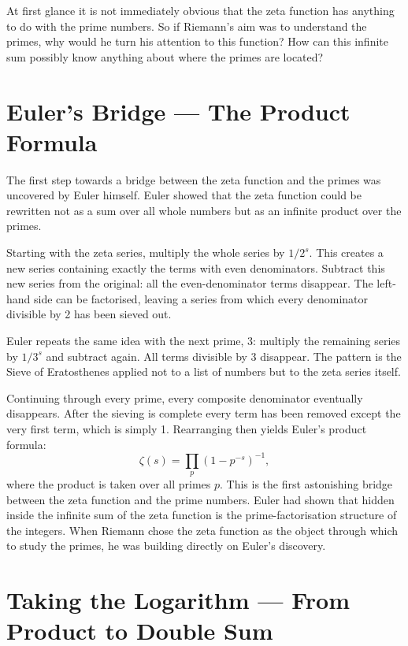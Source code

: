\documentclass[11pt]{article}
\begin{document}
At first glance it is not immediately obvious that the zeta function has anything to do with the prime numbers. So if Riemann's aim was to understand the primes, why would he turn his attention to this function? How can this infinite sum possibly know anything about where the primes are located?

\section{Euler's Bridge --- The Product Formula}

The first step towards a bridge between the zeta function and the primes was uncovered by Euler himself. Euler showed that the zeta function could be rewritten not as a sum over all whole numbers but as an infinite product over the primes.

Starting with the zeta series, multiply the whole series by $1/2^s$. This creates a new series containing exactly the terms with even denominators. Subtract this new series from the original: all the even-denominator terms disappear. The left-hand side can be factorised, leaving a series from which every denominator divisible by 2 has been sieved out.

Euler repeats the same idea with the next prime, 3: multiply the remaining series by $1/3^s$ and subtract again. All terms divisible by 3 disappear. The pattern is the Sieve of Eratosthenes applied not to a list of numbers but to the zeta series itself.

Continuing through every prime, every composite denominator eventually disappears. After the sieving is complete every term has been removed except the very first term, which is simply 1. Rearranging then yields Euler's product formula:
\[
\zeta(s) = \prod_{p} \left(1 - p^{-s}\right)^{-1},
\]
where the product is taken over all primes $p$. This is the first astonishing bridge between the zeta function and the prime numbers. Euler had shown that hidden inside the infinite sum of the zeta function is the prime-factorisation structure of the integers. When Riemann chose the zeta function as the object through which to study the primes, he was building directly on Euler's discovery.

\section{Taking the Logarithm --- From Product to Double Sum}
\end{document}
